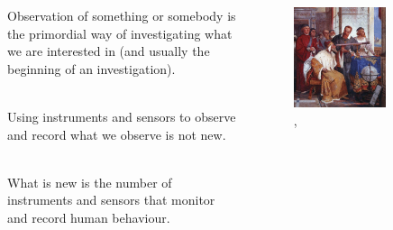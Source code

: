 \documentclass[serif, aspectratio=169]{beamer}
\begin{document}
\begin{frame}

\begin{columns}
\begin{column}{0.4\textwidth}

Observation of something or somebody is the primordial way of investigating what we are interested in (and usually the beginning of an investigation). \\~\

Using instruments and sensors to observe and record what we observe is not new.  \\~\

What is new is the number of instruments and sensors that monitor and record human behaviour.


\end{column}
\begin{column}{0.6\textwidth}

\begin{figure}

\includegraphics[width=0.7\textwidth]{figure/Bertini_fresco_of_Galileo_Galilei_and_Doge_of_Venice}
\caption{\footnotesize{, \cite{bertini_galileo_1858}}}
\end{figure}

\end{column}
\end{columns}

\end{frame}
\end{document}
